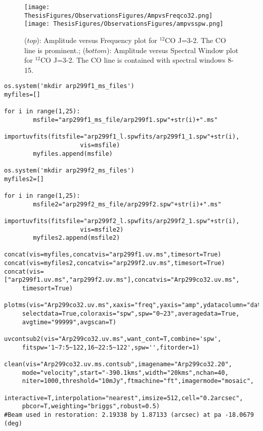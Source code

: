 \begin{figure}[h]
\centering
\texttt{[image: ThesisFigures/ObservationsFigures/AmpvsFreqco32.png]} 
\texttt{[image: ThesisFigures/ObservationsFigures/ampvsspw.png]} 
\caption[Amplitude versus Frequency and Amplitude versus Spectral Window plots for $^{12}$CO J=3-2]{($top$): Amplitude versus Frequency plot for $^{12}$CO J=3-2. The CO line is prominent.; ($bottom$): Amplitude versus Spectral Window plot for $^{12}$CO J=3-2. The CO line is contained with spectral windows 8-15. }
\label{uvcont}
\end{figure}

\begin{verbatim}
os.system('mkdir arp299f1_ms_files')
myfiles=[]

for i in range(1,25):
        msfile="arp299f1_ms_file/arp299f1.spw"+str(i)+".ms"
        importuvfits(fitsfile="arp299f1_l.spwfits/arp299f1_1.spw"+str(i),
                     vis=msfile)
        myfiles.append(msfile)
	
os.system('mkdir arp299f2_ms_files')
myfiles2=[]

for i in range(1,25):
        msfile2="arp299f2_ms_file/arp299f2.spw"+str(i)+".ms"
        importuvfits(fitsfile="arp299f2_l.spwfits/arp299f2_1.spw"+str(i), 
                     vis=msfile2)
        myfiles2.append(msfile2)
	
concat(vis=myfiles,concatvis="arp299f1.uv.ms",timesort=True)
concat(vis=myfiles2,concatvis="arp299f2.uv.ms",timesort=True)
concat(vis=["arp299f1.uv.ms","arp299f2.uv.ms"],concatvis="Arp299co32.uv.ms",
     timesort=True)

plotms(vis="Arp299co32.uv.ms",xaxis="freq",yaxis="amp",ydatacolumn="data",
     selectdata=True,coloraxis="spw",spw="0~23",averagedata=True,
     avgtime="99999",avgscan=T)

uvcontsub2(vis="Arp299co32.uv.ms",want_cont=T,combine='spw',
     fitspw='1~7:5~122,16~22:5~122',spw='',fitorder=1)

clean(vis="Arp299co32.uv.ms.contsub",imagename="Arp299co32.20",
     mode="velocity",start="-390.1kms",width="20kms",nchan=40,
     niter=1000,threshold="10mJy",ftmachine="ft",imagermode="mosaic",
     interactive=T,interpolation="nearest",imsize=512,cell="0.2arcsec",
     pbcor=T,weighting="briggs",robust=0.5)
#Beam used in restoration: 2.19338 by 1.87133 (arcsec) at pa -18.0679 (deg) 
\end{verbatim}

